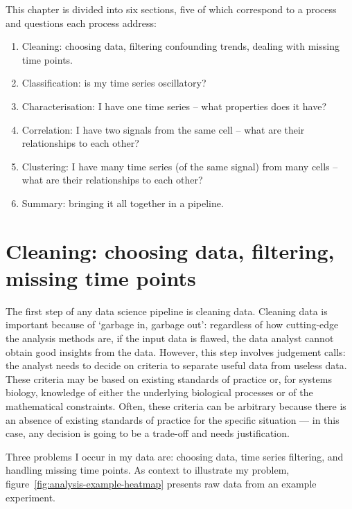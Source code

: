 This chapter is divided into six sections, five of which correspond to a process and questions each process address:
\begin{enumerate}
  \item Cleaning: choosing data, filtering confounding trends, dealing with missing time points.
  \item Classification: is my time series oscillatory?
  \item Characterisation: I have one time series -- what properties does it have?
  \item Correlation: I have two signals from the same cell -- what are their relationships to each other?
  \item Clustering: I have many time series (of the same signal) from many cells -- what are their relationships to each other?
  \item Summary: bringing it all together in a pipeline.
\end{enumerate}

\section[Cleaning]{Cleaning: choosing data, filtering, missing time points}
\label{sec:analysis-cleaning}

The first step of any data science pipeline is cleaning data.%
Cleaning data is important because of `garbage in, garbage out': regardless of how cutting-edge the analysis methods are, if the input data is flawed, the data analyst cannot obtain good insights from the data.
However, this step involves judgement calls: the analyst needs to decide on criteria to separate useful data from useless data.
These criteria may be based on existing standards of practice or, for systems biology, knowledge of either the underlying biological processes or of the mathematical constraints.
Often, these criteria can be arbitrary because there is an absence of existing standards of practice for the specific situation --- in this case, any decision is going to be a trade-off and needs justification.

Three problems I occur in my data are: choosing data, time series filtering, and handling missing time points.
As context to illustrate my problem, figure~\ref{fig:analysis-example-heatmap} presents raw data from an example experiment.

